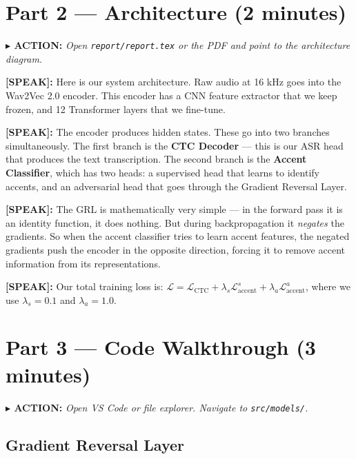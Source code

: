 \documentclass[12pt,a4paper]{article}
\newcommand{\say}[1]{%
  \begin{speakbox}
  \textbf{\color{speakblue}[SPEAK]:} #1
  \end{speakbox}
  \vspace{4pt}
}
\newcommand{\action}[1]{%
  \vspace{2pt}
  \noindent\textbf{\color{sectionred}$\blacktriangleright$ ACTION:} \textit{#1}
  \vspace{4pt}
}
\begin{document}
\section{Part 2 --- Architecture (2 minutes)}

\action{Open \texttt{report/report.tex} or the PDF and point to the architecture diagram.}

\say{Here is our system architecture. Raw audio at 16 kHz goes into the Wav2Vec 2.0 encoder.
This encoder has a CNN feature extractor that we keep frozen, and 12 Transformer layers that
we fine-tune.}

\say{The encoder produces hidden states. These go into two branches simultaneously.
The first branch is the \textbf{CTC Decoder} --- this is our ASR head that produces the
text transcription. The second branch is the \textbf{Accent Classifier}, which has two heads:
a supervised head that learns to identify accents, and an adversarial head that goes through
the Gradient Reversal Layer.}

\say{The GRL is mathematically very simple --- in the forward pass it is an identity function,
it does nothing. But during backpropagation it \textit{negates} the gradients. So when the
accent classifier tries to learn accent features, the negated gradients push the encoder in
the opposite direction, forcing it to remove accent information from its representations.}

\say{Our total training loss is:
$\mathcal{L} = \mathcal{L}_{\text{CTC}} + \lambda_s \mathcal{L}_{\text{accent}}^{s}
+ \lambda_a \mathcal{L}_{\text{accent}}^{a}$, where we use $\lambda_s = 0.1$ and
$\lambda_a = 1.0$.}

\section{Part 3 --- Code Walkthrough (3 minutes)}

\action{Open VS Code or file explorer. Navigate to \texttt{src/models/}.}

\subsection{Gradient Reversal Layer}
\end{document}
